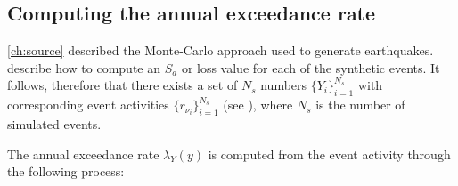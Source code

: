 \subsection{Computing the annual exceedance rate}
\label{sec:risk-ann-exceed-rate}

\cref{ch:source} described the Monte-Carlo approach used to
generate earthquakes.  describe how
to compute an $S_a$ or loss value for each of the synthetic
events. It follows, therefore that there exists a set of $N_s$
numbers $\{Y_i\}_{i=1}^{N_s}$ with corresponding event activities
$\{r_{\nu _i}\}_{i=1}^{N_s}$ (see ),
where $N_s$ is the number of simulated events.

The annual exceedance rate $\lambda_Y(y)$ is computed from the
event activity through the following process:
